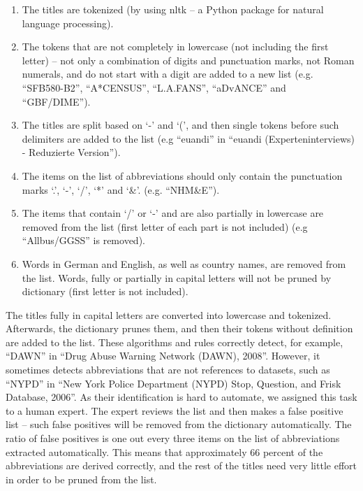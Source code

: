 \documentclass{IOS-Book-Article}
\begin{document}
\begin{enumerate}
	\item The titles are tokenized (by using nltk -- a Python package for natural language processing).
	\item The tokens that are not completely in lowercase (not including the first letter) -- not only a combination of digits and punctuation marks, not Roman numerals, and do not start with a digit are added to a new list (e.g. \enquote{SFB580-B2}, \enquote{A*CENSUS}, \enquote{L.A.FANS}, \enquote{aDvANCE}
	and \enquote{GBF/DIME}).
	\item The titles are split based on `-' and `(', and then single tokens before such delimiters are added to the list (e.g \enquote{euandi} in \enquote{euandi (Experteninterviews) - Reduzierte Version}).
	\item The items on the list of abbreviations should only contain the punctuation marks `.', `-', `/', `*' and `\&'. (e.g. \enquote{NHM\&E}).
	\item The items that contain `/' or `-' and are also partially in lowercase are removed from the list (first letter of each part is not included) (e.g \enquote{Allbus/GGSS} is removed). 
	\item Words in German and English, as well as country names, are removed from the list. Words, fully or partially in capital letters will not be pruned by dictionary (first letter is not included).
\end{enumerate}
The titles fully in capital letters are converted into lowercase and tokenized. Afterwards, the dictionary prunes them, and then their tokens without definition are added to the list.
These algorithms and rules correctly detect, for example, \enquote{DAWN} in \enquote{Drug Abuse Warning Network (DAWN), 2008}. However, it sometimes detects abbreviations that are not references to datasets, such as \enquote{NYPD} in \enquote{New York Police Department (NYPD) Stop, Question, and Frisk Database, 2006}. As their identification is hard to automate, we assigned this task to a human expert. 
The expert reviews the list and then makes a false positive list -- such false positives will be removed from the dictionary automatically. The ratio of false positives is one out every three items on the list of abbreviations extracted automatically. This means that approximately 66 percent of the abbreviations are derived correctly, and the rest of the titles need very little effort in order to be pruned from the list.
\end{document}

